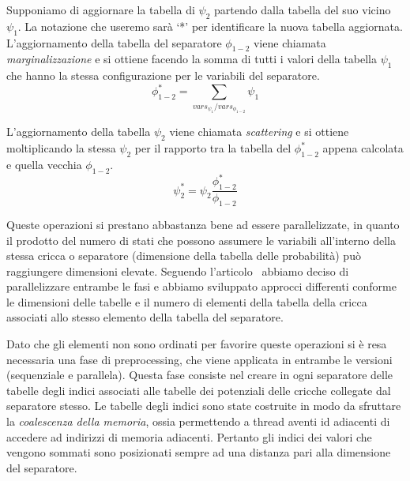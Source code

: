 \documentclass[a4paper]{article}   %
\begin{document}
Supponiamo di aggiornare la tabella di $\psi_2$ partendo dalla tabella del suo vicino $\psi_1$.
La notazione che useremo sarà `*' per identificare la nuova tabella aggiornata.
L'aggiornamento della tabella del separatore $\phi_{1-2}$ viene chiamata \emph{marginalizzazione} e si ottiene facendo la somma di tutti i valori della tabella $\psi_1$ che hanno la stessa configurazione per le variabili del separatore.
\[
\phi_{1-2}^* = \sum_{vars_{\psi_1}/vars_{\phi_{1-2}}} \psi_1
\]

L'aggiornamento della tabella $\psi_2$ viene chiamata \emph{scattering} e si ottiene moltiplicando la stessa $\psi_2$ per il rapporto tra la tabella del $\phi_{1-2}^*$ appena calcolata e quella vecchia $\phi_{1-2}$.
\[
\psi_2^* = \psi_2 \frac{\phi_{1-2}^*}{\phi_{1-2}}
\]

Queste operazioni si prestano abbastanza bene ad essere parallelizzate, in quanto il prodotto del numero di stati che possono assumere le variabili all'interno della stessa cricca o separatore (dimensione della tabella delle probabilità) può raggiungere dimensioni elevate.
Seguendo l'articolo~\cite{zheng2011belief} abbiamo deciso di parallelizzare 
entrambe le fasi e %
abbiamo sviluppato approcci differenti conforme le dimensioni delle tabelle e il numero di elementi della tabella della cricca associati allo stesso elemento della tabella del separatore.

Dato che gli elementi non sono ordinati per favorire queste operazioni si è resa necessaria una fase di preprocessing, che viene applicata in entrambe le versioni (sequenziale e parallela). %
Questa fase consiste nel creare in ogni separatore delle tabelle degli indici associati alle tabelle dei potenziali delle cricche collegate dal separatore stesso.
Le tabelle degli indici sono state costruite %
in modo da sfruttare la \emph{coalescenza della memoria}, ossia permettendo a thread aventi id adiacenti di accedere ad indirizzi di memoria adiacenti. Pertanto gli indici dei valori che vengono sommati sono posizionati sempre ad una distanza pari alla dimensione del separatore.
\end{document}
